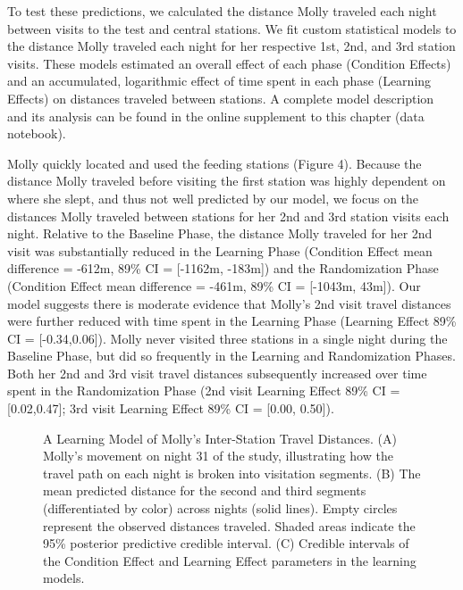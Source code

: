 \documentclass[twoside,12pt,final]{ucthesis-CA2012}
\begin{document}
\begin{ucmainmatter}
To test these predictions, we calculated the distance Molly traveled each night between visits to the test and central stations. We fit custom statistical models to the distance Molly traveled each night for her respective 1st, 2nd, and 3rd station visits. These models estimated an overall effect of each phase (Condition Effects) and an accumulated, logarithmic effect of time spent in each phase (Learning Effects) on distances traveled between stations. A complete model description and its analysis can be found in the online supplement to this chapter (data notebook).

Molly quickly located and used the feeding stations (Figure 4). Because the distance Molly traveled before visiting the first station was highly dependent on where she slept, and thus not well predicted by our model, we focus on the distances Molly traveled between stations for her 2nd and 3rd station visits each night. Relative to the Baseline Phase, the distance Molly traveled for her 2nd visit was substantially reduced in the Learning Phase (Condition Effect mean difference = -612m, 89\% CI = {[}-1162m, -183m{]}) and the Randomization Phase (Condition Effect mean difference = -461m, 89\% CI = {[}-1043m, 43m{]}). Our model suggests there is moderate evidence that Molly's 2nd visit travel distances were further reduced with time spent in the Learning Phase (Learning Effect 89\% CI = {[}-0.34,0.06{]}). Molly never visited three stations in a single night during the Baseline Phase, but did so frequently in the Learning and Randomization Phases. Both her 2nd and 3rd visit travel distances subsequently increased over time spent in the Randomization Phase (2nd visit Learning Effect 89\% CI = {[}0.02,0.47{]}; 3rd visit Learning Effect 89\% CI = {[}0.00, 0.50{]}).
\begin{figure}[htbp]
\centering
\setlength{\fboxsep}{0pt}
\setlength{\fboxrule}{1pt}
\caption[A Learning Model of Molly’s Inter-Station Travel Distances]{A Learning Model of Molly’s Inter-Station Travel Distances. (A) Molly’s movement on night 31 of the study, illustrating how the travel path on each night is broken into visitation segments. (B) The mean predicted distance for the second and third segments (differentiated by color) across nights (solid lines). Empty circles represent the observed distances traveled. Shaded areas indicate the 95\% posterior predictive credible interval. (C) Credible intervals of the Condition Effect and Learning Effect parameters in the learning models.
\label{Figure 4. A learning model of Molly's interstation-travel distances}}
\end{figure}
\hypertarget{discussion-2}{%
}
\end{ucmainmatter}
\end{document}
